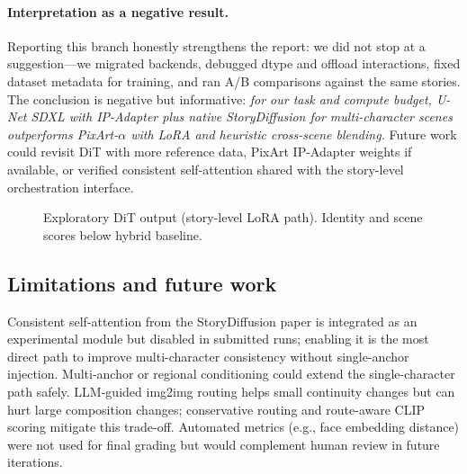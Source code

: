 \paragraph{Interpretation as a negative result.}
Reporting this branch honestly strengthens the report: we did not stop at a suggestion---we migrated backends, debugged dtype and offload interactions, fixed dataset metadata for training, and ran A/B comparisons against the same stories.
The conclusion is negative but informative: \emph{for our task and compute budget, U-Net SDXL with IP-Adapter plus native StoryDiffusion for multi-character scenes outperforms PixArt-$\alpha$ with LoRA and heuristic cross-scene blending.}
Future work could revisit DiT with more reference data, PixArt IP-Adapter weights if available, or verified consistent self-attention shared with the story-level orchestration interface.

\begin{figure}[!t]
  \centering
  \caption{Exploratory DiT output (story-level LoRA path). Identity and scene scores below hybrid baseline.}
  \label{fig:dit_panels}
\end{figure}

\subsection{Limitations and future work}
Consistent self-attention from the StoryDiffusion paper is integrated as an experimental module but disabled in submitted runs; enabling it is the most direct path to improve multi-character consistency without single-anchor injection.
Multi-anchor or regional conditioning could extend the single-character path safely.
LLM-guided img2img routing helps small continuity changes but can hurt large composition changes; conservative routing and route-aware CLIP scoring mitigate this trade-off.
Automated metrics (e.g., face embedding distance) were not used for final grading but would complement human review in future iterations.
